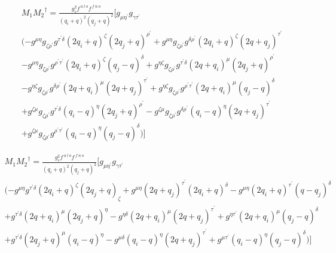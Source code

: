 \begin{equation}
\begin{split}
M_1{M_2}^{\dagger}=\frac{g_s^2 f^{\:a\:l\:o} f^{\:f\:n\: o}}{(q_i +q)^2 (q_j +q)^2}
[g_{{\mu}{{\eta}^{\prime}}} g_{{\gamma}{{\tau}^{\prime}}}\\
(-g^{{\mu}{\eta}}g_{{{\zeta}}{{\rho}^{\prime}}}g^{{{\tau}^{\prime}}{{\delta}}}(2q_i+q)^{\zeta}(2q_j+q)^{{\rho}^{\prime}}
+g^{{\mu}{\eta}}g_{{{\zeta}}{{\rho}^{\prime}}}g^{{{\delta}}{{\rho}^{\prime}}}(2q_i+q)^{\zeta}(2q +q_j)^{{\tau}^{\prime}}\\
-g^{{\mu}{\eta}}g_{{{\zeta}}{{\rho}^{\prime}}}g^{{{\rho}^{\prime}}{{\tau}^{\prime}}}(2q_i+q)^{\zeta}(q_j-q)^{{\delta}}
+g^{{\eta}{\zeta}}g_{{{\zeta}}{{\rho}^{\prime}}}g^{{{\tau}^{\prime}}{{\delta}}}(2q +q_i)^{\mu}(2q_j+q)^{{\rho}^{\prime}}\\
-g^{{\eta}{\zeta}}g_{{{\zeta}}{{\rho}^{\prime}}}g^{{{\delta}}{{\rho}^{\prime}}}(2q +q_i)^{\mu}(2q +q_j)^{{\tau}^{\prime}}
+g^{{\eta}{\zeta}}g_{{{\zeta}}{{\rho}^{\prime}}}g^{{{\rho}^{\prime}}{{\tau}^{\prime}}}(2q +q_i)^{\mu}(q_j-q)^{{\delta}}\\
+g^{{\zeta}{\mu}}g_{{{\zeta}}{{\rho}^{\prime}}}g^{{{\tau}^{\prime}}{{\delta}}}(q_i -q)^{\eta}(2q_j+q)^{{\rho}^{\prime}}
-g^{{\zeta}{\mu}}g_{{{\zeta}}{{\rho}^{\prime}}}g^{{{\delta}}{{\rho}^{\prime}}}(q_i -q)^{\eta}(2q +q_j)^{{\tau}^{\prime}}\\
+g^{{\zeta}{\mu}}g_{{{\zeta}}{{\rho}^{\prime}}}g^{{{\rho}^{\prime}}{{\tau}^{\prime}}}(q_i -q)^{\eta}(q_j-q)^{{\delta}})]
\end{split}
\end{equation}


\begin{equation}
\begin{split}
M_1{M_2}^{\dagger}=\frac{g_s^2 f^{\:a\:l\:o} f^{\:f\:n\: o}}{(q_i +q)^2 (q_j +q)^2}
[g_{{\mu}{{\eta}^{\prime}}} g_{{\gamma}{{\tau}^{\prime}}}\\
(-g^{{\mu}{\eta}}g^{{{\tau}^{\prime}}{{\delta}}}(2q_i+q)^{\zeta}(2q_j+q)_{{\zeta}}+g^{{\mu}{\eta}}(2q +q_j)^{{\tau}^{\prime}}(2q_i+q)^{\delta}
-g^{{\mu}{\eta}}(2q_i +q)^{{\tau}^{\prime}}(q-q_j)^{{\delta}}\\
+g^{{{\tau}^{\prime}}{{\delta}}}(2q +q_i)^{\mu}(2q_j+q)^{{\eta}}-g^{{\eta}{\delta}}(2q +q_i)^{\mu}(2q +q_j)^{{\tau}^{\prime}}+g^{{{\eta}}{{\tau}^{\prime}}}(2q +q_i)^{\mu}(q_j-q)^{{\delta}}\\
+g^{{{\tau}^{\prime}}{{\delta}}}(2q_j+q)^{{\mu}}(q_i -q)^{\eta}-g^{{\mu}{\delta}}(q_i -q)^{\eta}(2q +q_j)^{{\tau}^{\prime}}+g^{{{\mu}}{{\tau}^{\prime}}}(q_i -q)^{\eta}(q_j-q)^{{\delta}})]
\end{split}
\end{equation}
\pagebreak

